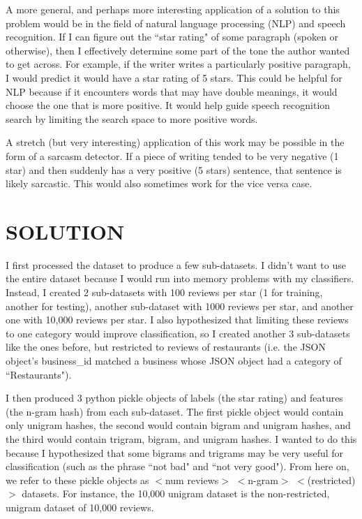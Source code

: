 \documentclass[11pt, onecolumn]{IEEEtran}
\begin{document}
A more general, and perhaps more interesting application of a solution to this problem would be in the field of natural language processing (NLP) and speech recognition. If I can figure out the ``star rating" of some paragraph (spoken or otherwise), then I effectively determine some part of the tone the author wanted to get across. For example, if the writer writes a particularly positive paragraph, I would predict it would have a star rating of 5 stars. This could be helpful for NLP because if it encounters words that may have double meanings, it would choose the one that is more positive. It would help guide speech recognition search by limiting the search space to more positive words. 

A stretch (but very interesting) application of this work may be possible in the form of a sarcasm detector. If a piece of writing tended to be very negative (1 star) and then suddenly has a very positive (5 stars) sentence, that sentence is likely sarcastic. This would also sometimes work for the vice versa case.
\section{SOLUTION}
I first processed the dataset to produce a few sub-datasets. I didn't want to use the entire dataset because I would run into memory problems with my classifiers. Instead, I created 2 sub-datasets with 100 reviews per star (1 for training, another for testing), another sub-dataset with 1000 reviews per star, and another one with 10,000 reviews per star. I also hypothesized that limiting these reviews to one category would improve classification, so I created another 3 sub-datasets like the ones before, but restricted to reviews of restaurants (i.e. the JSON object's business\_id matched a business whose JSON object had a category of ``Restaurants").

I then produced 3 python pickle objects of labels (the star rating) and features (the n-gram hash) from each sub-dataset. The first pickle object would contain only unigram hashes, the second would contain bigram and unigram hashes, and the third would contain trigram, bigram, and unigram hashes. I wanted to do this because I hypothesized that some bigrams and trigrams may be very useful for classification (such as the phrase ``not bad" and ``not very good"). From here on, we refer to these pickle objects as $<$num reviews$>$ $<$n-gram$>$ $<$(restricted)$>$ datasets. For instance, the 10,000 unigram dataset is the non-restricted, unigram dataset of 10,000 reviews.
\end{document}
